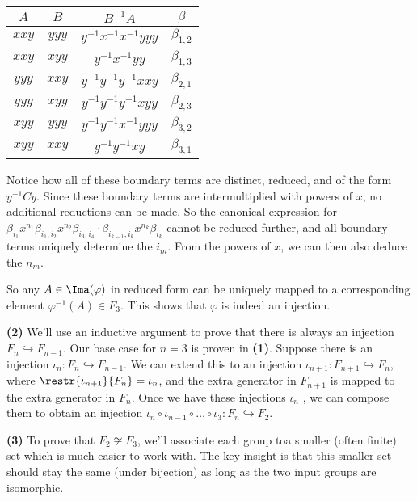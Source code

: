 \documentclass[11pt,letterpaper]{article}
\begin{document}
\begin{center}
  \begin{tabular}{ |c|c|c|c| }
    \hline
    $A$ & $B$ & $B^{-1}A$ & $\beta$ \\
    \hline
    $xxy$ & $yyy$ & $y^{-1}x^{-1}x^{-1}yyy$ & $\beta_{1,2}$\\
    \hline
    $xxy$ & $xyy$ & $y^{-1}x^{-1}yy$ & $\beta_{1,3}$ \\
    \hline
    $yyy$ & $xxy$ & $y^{-1}y^{-1}y^{-1}xxy$ & $\beta_{2,1}$ \\
    \hline
    $yyy$ & $xyy$ & $y^{-1}y^{-1}y^{-1}xyy$ & $\beta_{2,3}$ \\
    \hline
    $xyy$ & $yyy$ & $y^{-1}y^{-1}x^{-1}yyy$ & $\beta_{3,2}$ \\
    \hline
    $xyy$ & $xxy$ & $y^{-1}y^{-1}xy$ & $\beta_{3,1}$ \\
    \hline 
  \end{tabular}
\end{center}

Notice how all of these boundary terms are distinct, reduced, and of the form $y^{-1}Cy$. Since these boundary terms are intermultiplied with powers of $x$, no additional reductions can be made. So the canonical expression for $\beta_{i_1} x^{n_1}\beta_{i_1,i_2} x^{n_2}\beta_{i_3,i_4} \cdot \beta_{i_{k-1}, i_k}x^{n_k}\beta_{i_{k}}$ cannot be reduced further, and all boundary terms uniquely determine the $i_m$. From the powers of $x$, we can then also deduce the $n_m$. 

So any $A\in \Ima(\varphi)$ in reduced form can be uniquely mapped to a corresponding element $\varphi^{-1}(A)\in F_3$. This shows that $\varphi$ is indeed an injection.

\textbf{(2)} We'll use an inductive argument to prove that there is always an injection $F_n \hookrightarrow F_{n-1}$. Our base case for $n=3$ is proven in \textbf{(1)}. Suppose there is an injection $\iota_n : F_n \hookrightarrow F_{n-1}$. We can extend this to an injection $\iota_{n+1} : F_{n+1} \hookrightarrow F_{n}$, where $\restr{\iota_{n+1}}{F_n} = \iota_n$, and the extra generator in $F_{n+1}$ is mapped to the extra generator in $F_{n}$. Once we have these injections $\iota_n$ , we can compose them to obtain an injection $\iota_n \circ \iota_{n-1} \circ \ldots \circ \iota_3 : F_n \hookrightarrow F_2$.   

\textbf{(3)} To prove that $F_2\not\cong F_3$, we'll associate each group toa  smaller (often finite) set which is much easier to work with. The key insight is that this smaller set should stay the same (under bijection) as long as the two input groups are isomorphic.
\end{document}

